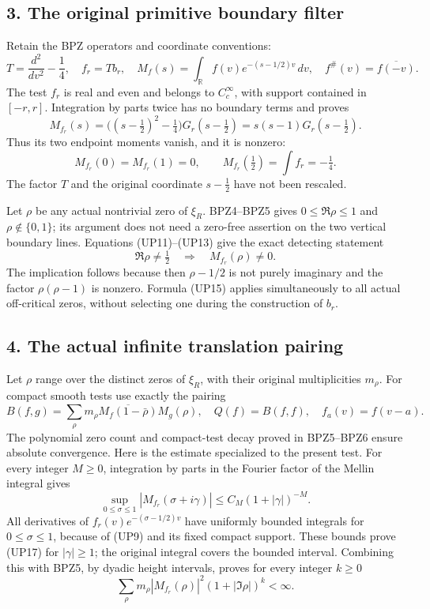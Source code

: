 \documentclass[
  10pt,
  a4paper,
]{article}
\begin{document}
\subsection{3. The original primitive boundary
filter}\label{the-original-primitive-boundary-filter}

Retain the BPZ operators and coordinate conventions: \[
T=\frac{d^2}{dv^2}-\frac14,\quad f_r=T b_r,\quad
M_f(s)=\int_{\mathbb R}f(v)e^{-(s-1/2)v}\,dv,\quad
f^\#(v)=\overline{f(-v)}.
\tag{UP12}
\] The test \(f_r\) is real and even and belongs to \(C_c^\infty\), with
support contained in \([-r,r]\). Integration by parts twice has no
boundary terms and proves \[
M_{f_r}(s)
=\bigl((s-\tfrac12)^2-\tfrac14\bigr)G_r(s-\tfrac12)
=s(s-1)G_r(s-\tfrac12).
\tag{UP13}
\] Thus its two endpoint moments vanish, and it is nonzero: \[
M_{f_r}(0)=M_{f_r}(1)=0,
\qquad M_{f_r}(\tfrac12)=\int f_r=-\tfrac14.
\tag{UP14}
\] The factor \(T\) and the original coordinate \(s-\tfrac12\) have not
been rescaled.

Let \(\rho\) be any actual nontrivial zero of \(\xi_R\). BPZ4--BPZ5
gives \(0\le\Re\rho\le1\) and \(\rho\notin\{0,1\}\); its argument does
not need a zero-free assertion on the two vertical boundary lines.
Equations (UP11)--(UP13) give the exact detecting statement \[
\Re\rho\ne\tfrac12\quad\Longrightarrow\quad M_{f_r}(\rho)\ne0.
\tag{UP15}
\] The implication follows because then \(\rho-1/2\) is not purely
imaginary and the factor \(\rho(\rho-1)\) is nonzero. Formula (UP15)
applies simultaneously to all actual off-critical zeros, without
selecting one during the construction of \(b_r\).

\subsection{4. The actual infinite translation
pairing}\label{the-actual-infinite-translation-pairing}

Let \(\rho\) range over the distinct zeros of \(\xi_R\), with their
original multiplicities \(m_\rho\). For compact smooth tests use exactly
the pairing \[
B(f,g)=\sum_\rho m_\rho\overline{M_f(1-\bar\rho)}M_g(\rho),
\quad Q(f)=B(f,f),\quad f_a(v)=f(v-a).
\tag{UP16}
\] The polynomial zero count and compact-test decay proved in BPZ5--BPZ6
ensure absolute convergence. Here is the estimate specialized to the
present test. For every integer \(M\ge0\), integration by parts in the
Fourier factor of the Mellin integral gives \[
\sup_{0\le\sigma\le1}|M_{f_r}(\sigma+i\gamma)|
\le C_M(1+|\gamma|)^{-M}.
\tag{UP17}
\] All derivatives of \(f_r(v)e^{-(\sigma-1/2)v}\) have uniformly
bounded integrals for \(0\le\sigma\le1\), because of (UP9) and its fixed
compact support. These bounds prove (UP17) for \(|\gamma|\ge1\); the
original integral covers the bounded interval. Combining this with BPZ5,
by dyadic height intervals, proves for every integer \(k\ge0\) \[
\sum_\rho m_\rho|M_{f_r}(\rho)|^2(1+|\Im\rho|)^k<\infty.
\tag{UP18}
\]
\end{document}
